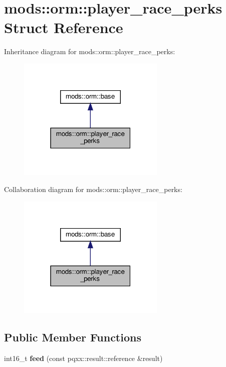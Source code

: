 \hypertarget{structmods_1_1orm_1_1player__race__perks}{}\section{mods\+:\+:orm\+:\+:player\+\_\+race\+\_\+perks Struct Reference}
\label{structmods_1_1orm_1_1player__race__perks}


Inheritance diagram for mods\+:\+:orm\+:\+:player\+\_\+race\+\_\+perks\+:\nopagebreak
\begin{figure}[H]
\begin{center}
\leavevmode
\includegraphics[width=199pt]{structmods_1_1orm_1_1player__race__perks__inherit__graph}
\end{center}
\end{figure}


Collaboration diagram for mods\+:\+:orm\+:\+:player\+\_\+race\+\_\+perks\+:\nopagebreak
\begin{figure}[H]
\begin{center}
\leavevmode
\includegraphics[width=199pt]{structmods_1_1orm_1_1player__race__perks__coll__graph}
\end{center}
\end{figure}
\subsection*{Public Member Functions}
\begin{DoxyCompactItemize}
\item 
\mbox{\label{structmods_1_1orm_1_1player__race__perks_a4c449958b5bf988ba4565d2d075b0c20}} 
int16\+\_\+t {\bfseries feed} (const pqxx\+::result\+::reference \&result)
\end{DoxyCompactItemize}
